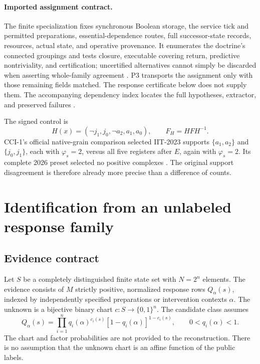 \documentclass[11pt]{article}
\theoremstyle{definition}\newtheorem{definition}[theorem]{Definition}
\theoremstyle{remark}\newtheorem{remark}[theorem]{Remark}
\newcommand{\B}{\{0,1\}}
\begin{document}
\paragraph{Imported assignment contract.}
The finite specialization fixes synchronous Boolean storage, the service tick and permitted preparations, essential-dependence routes, full successor-state records, resources, actual state, and operative provenance. It enumerates the doctrine's connected groupings and tests closure, executable covering return, predictive nontriviality, and certification; uncertified alternatives cannot simply be discarded when asserting whole-family agreement \cite[Sections~2--4, FRD-01--FRD-04]{frd1}. P3 transports the assignment only with those remaining fields matched. The response certificate below does not supply them. The accompanying dependency index locates the full hypotheses, extractor, and preserved failures \cite{support}.

The signed control is
\begin{equation}H(x)=(\neg j_1,j_0,\neg a_2,a_1,a_0),\qquad F_H=HFH^{-1}.\end{equation}
CCI-1's official native-grain comparison selected IIT-2023 supports $\{a_1,a_2\}$ and $\{j_0,j_1\}$, each with $\varphi_s=2$, versus all five registers after $E$, again with $\varphi_s=2$. Its complete 2026 preset selected no positive complexes \cite[Sections~2--4]{cci}. The original support disagreement is therefore already more precise than a difference of counts.

\section{Identification from an unlabeled response family}
\subsection{Evidence contract}
Let $S$ be a completely distinguished finite state set with $N=2^n$ elements. The evidence consists of $M$ strictly positive, normalized response rows $Q_\alpha(s)$, indexed by independently specified preparations or intervention contexts $\alpha$. The unknown is a bijective binary chart $c:S\to\B^n$. The candidate class assumes
\begin{equation}
Q_\alpha(s)=\prod_{i=1}^n q_i(\alpha)^{c_i(s)}[1-q_i(\alpha)]^{1-c_i(s)},\qquad 0<q_i(\alpha)<1.\label{eq:product}
\end{equation}
The chart and factor probabilities are not provided to the reconstruction. There is no assumption that the unknown chart is an affine function of the public labels.
\end{document}

